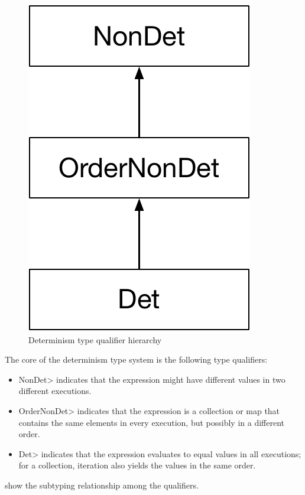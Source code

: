 \begin{figure}
    \begin{center}
        \includegraphics[scale=0.37]{detHierarchy}
    \end{center}
    \caption{Determinism type qualifier hierarchy}
    \label{fig:determinism-hierarchy}
\end{figure}

The core of the determinism type system is the following type qualifiers:
\begin{itemize}
    \item \<NonDet> indicates
    that the expression might have different values in two different executions.
    \item \<OrderNonDet> indicates that the expression is a collection or
      map that contains the same elements in every execution, but possibly
      in a different order.
    \item \<Det> indicates that the expression evaluates to equal values in
      all executions; for a collection, iteration
      also yields the values in the same order.
\end{itemize}
 show the subtyping
relationship among the qualifiers.

